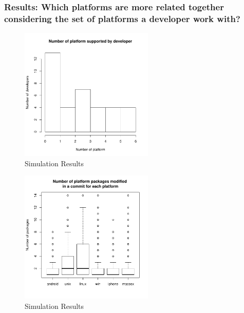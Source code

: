 \documentclass[10pt, conference]{IEEEtran}
\begin{document}
\subsubsection{Results: Which platforms are more related together considering the set of platforms a developer work with? }


\begin{figure}[!t]
\centering
\includegraphics[width=2.5in]{DeveloperSpecialization}
\caption{Simulation Results}
\label{fig_sim}
\end{figure}

\begin{figure}[!t]
\centering
\includegraphics[width=2.5in]{packagesbyplatform}
\caption{Simulation Results}
\label{fig_sim}
\end{figure}



%
%
\end{document}
